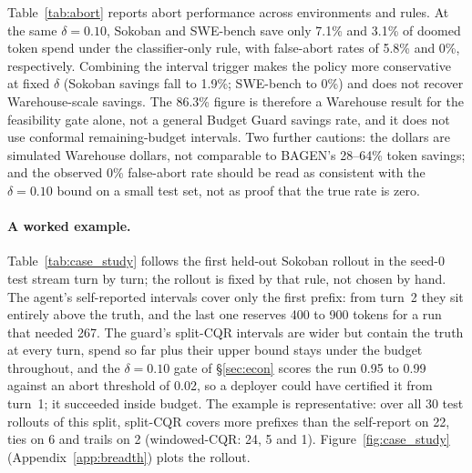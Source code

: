 \documentclass{article}
\begin{document}
Table~\ref{tab:abort} reports abort performance across environments and rules. At the same $\delta{=}0.10$, Sokoban and SWE-bench save only 7.1\% and 3.1\% of doomed token spend under the classifier-only rule, with false-abort rates of 5.8\% and 0\%, respectively. Combining the interval trigger makes the policy more conservative at fixed $\delta$ (Sokoban savings fall to 1.9\%; SWE-bench to 0\%) and does not recover Warehouse-scale savings. The 86.3\% figure is therefore a Warehouse result for the feasibility gate alone, not a general Budget Guard savings rate, and it does not use conformal remaining-budget intervals. Two further cautions: the dollars are simulated Warehouse dollars, not comparable to BAGEN's 28--64\% token savings; and the observed 0\% false-abort rate should be read as consistent with the $\delta{=}0.10$ bound on a small test set, not as proof that the true rate is zero.

\paragraph{A worked example.}
Table~\ref{tab:case_study} follows the first held-out Sokoban rollout in the seed-0 test stream turn by turn; the rollout is fixed by that rule, not chosen by hand. The agent's self-reported intervals cover only the first prefix: from turn~2 they sit entirely above the truth, and the last one reserves 400 to 900 tokens for a run that needed 267. The guard's split-CQR intervals are wider but contain the truth at every turn, spend so far plus their upper bound stays under the budget throughout, and the $\delta{=}0.10$ gate of \S\ref{sec:econ} scores the run 0.95 to 0.99 against an abort threshold of 0.02, so a deployer could have certified it from turn~1; it succeeded inside budget. The example is representative: over all 30 test rollouts of this split, split-CQR covers more prefixes than the self-report on 22, ties on 6 and trails on 2 (windowed-CQR: 24, 5 and 1). Figure~\ref{fig:case_study} (Appendix~\ref{app:breadth}) plots the rollout.
\end{document}
